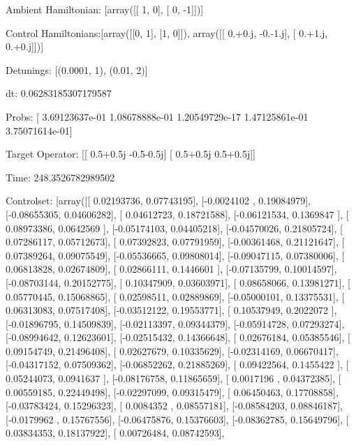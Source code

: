 \documentclass{article}
\begin{document}
    

\newpage

Ambient Hamiltonian: [array([[ 1,  0],
       [ 0, -1]])]

Control Hamiltonians:[array([[0, 1],
       [1, 0]]), array([[ 0.+0.j, -0.-1.j],
       [ 0.+1.j,  0.+0.j]])]

Detunings: [(0.0001, 1), (0.01, 2)]

 dt: 0.06283185307179587

Probs: [  3.69123637e-01   1.08678888e-01   1.20549729e-17   1.47125861e-01
   3.75071614e-01]

Target Operator: [[ 0.5+0.5j -0.5-0.5j]
 [ 0.5+0.5j  0.5+0.5j]]

Time: 248.3526782989502

Controlset: [array([[ 0.02193736,  0.07743195],
       [-0.0024102 ,  0.19084979],
       [-0.08655305,  0.04606282],
       [ 0.04612723,  0.18721588],
       [-0.06121534,  0.1369847 ],
       [ 0.08973386,  0.0642569 ],
       [-0.05174103,  0.04405218],
       [-0.04570026,  0.21805724],
       [ 0.07286117,  0.05712673],
       [ 0.07392823,  0.07791959],
       [-0.00361468,  0.21121647],
       [ 0.07389264,  0.09075549],
       [-0.05536665,  0.09808014],
       [-0.09047115,  0.07380006],
       [ 0.06813828,  0.02674809],
       [ 0.02866111,  0.1446601 ],
       [-0.07135799,  0.10014597],
       [-0.08703144,  0.20152775],
       [ 0.10347909,  0.03603971],
       [ 0.08658066,  0.13981271],
       [ 0.05770445,  0.15068865],
       [ 0.02598511,  0.02889869],
       [-0.05000101,  0.13375531],
       [ 0.06313083,  0.07517408],
       [-0.03512122,  0.19553771],
       [ 0.10537949,  0.2022072 ],
       [-0.01896795,  0.14509839],
       [-0.02113397,  0.09344379],
       [-0.05914728,  0.07293274],
       [-0.08994642,  0.12623601],
       [-0.02515432,  0.14366648],
       [ 0.02676184,  0.05385546],
       [ 0.09154749,  0.21496408],
       [ 0.02627679,  0.10335629],
       [-0.02314169,  0.06670417],
       [-0.04317152,  0.07509362],
       [-0.06852262,  0.21885269],
       [ 0.09422564,  0.1455422 ],
       [ 0.05244073,  0.0941637 ],
       [-0.08176758,  0.11865659],
       [ 0.0017196 ,  0.04372385],
       [ 0.00559185,  0.22449498],
       [-0.02297099,  0.09315479],
       [ 0.06450463,  0.17708858],
       [-0.03783424,  0.15296323],
       [ 0.0084352 ,  0.08557181],
       [-0.08584203,  0.08846187],
       [-0.0179962 ,  0.15767556],
       [-0.06475876,  0.15376603],
       [-0.08362785,  0.15649796],
       [ 0.03834353,  0.18137922],
       [ 0.00726484,  0.08742593],
\end{document}
